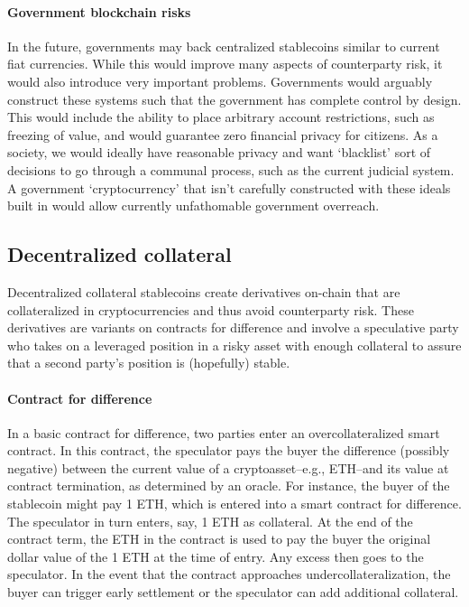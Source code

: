 \documentclass[10pt]{article}
\begin{document}
\paragraph{Government blockchain risks} In the future, governments may back centralized stablecoins similar to current fiat currencies. While this would improve many aspects of counterparty risk, it would also introduce very important problems. Governments would arguably construct these systems such that the government has complete control by design. This would include the ability to place arbitrary account restrictions, such as freezing of value, and would guarantee zero financial privacy for citizens. As a society, we would ideally have reasonable privacy and want `blacklist' sort of decisions to go through a communal process, such as the current judicial system. A government `cryptocurrency' that isn't carefully constructed with these ideals built in would allow currently unfathomable government overreach.



\subsection{Decentralized collateral}
Decentralized collateral stablecoins create derivatives on-chain that are collateralized in cryptocurrencies and thus avoid counterparty risk. These derivatives are variants on contracts for difference and involve a speculative party who takes on a leveraged position in a risky asset with enough collateral to assure that a second party's position is (hopefully) stable.

\paragraph{Contract for difference} In a basic contract for difference, two parties enter an overcollateralized smart contract. In this contract, the speculator pays the buyer the difference (possibly negative) between the current value of a cryptoasset--e.g., ETH--and its value at contract termination, as determined by an oracle. For instance, the buyer of the stablecoin might pay 1 ETH, which is entered into a smart contract for difference. The speculator in turn enters, say, 1 ETH as collateral. At the end of the contract term, the ETH in the contract is used to pay the buyer the original dollar value of the 1 ETH at the time of entry. Any excess then goes to the speculator. In the event that the contract approaches undercollateralization, the buyer can trigger early settlement or the speculator can add additional collateral.
\end{document}
